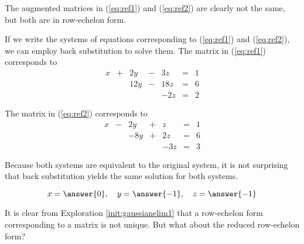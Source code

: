 \documentclass{ximera}
\begin{document}
\begin{exploration}
The augmented matrices in (\ref{eq:ref1}) and (\ref{eq:ref2}) are clearly not the same, but both are in row-echelon form.

If we write the systems of equations corresponding to (\ref{eq:ref1}) and (\ref{eq:ref2}), we can employ back substitution to solve them.  The matrix in (\ref{eq:ref1}) corresponds to
$$\begin{array}{ccccccccc}
      x &+ &2y&-&3z&= &1 \\
	 & &12y&-&18z&=&6\\
      &&&&-2z&=&2
    \end{array}$$
    
The matrix in (\ref{eq:ref2}) corresponds to    
$$\begin{array}{ccccccccc}
      x &- &2y&+&z&= &1 \\
	 & &-8y&+&2z&=&6\\
      &&&&-3z&=&3
    \end{array}$$
    
Because both systems are equivalent to the original system, it is not surprising that back substitution yields the same solution for both systems. 

$$x=\answer{0},\quad y=\answer{-1},\quad z=\answer{-1}$$

\end{exploration}

It is clear from Exploration \ref{init:gaussianelim1} that a row-echelon form corresponding to a matrix is not unique.  But what about the reduced row-echelon form?
\end{document}
